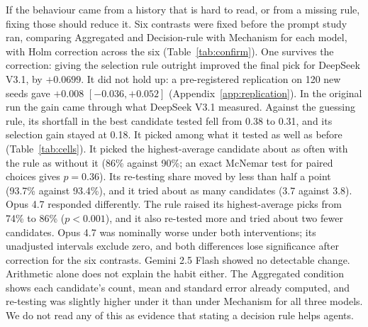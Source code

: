 If the behaviour came from a history that is hard to read, or from a missing rule, fixing those should reduce
it. Six contrasts were fixed before the prompt study ran, comparing Aggregated and Decision-rule with Mechanism for
each model, with Holm correction across the six (Table~\ref{tab:confirm}). One survives the correction: giving the selection rule outright improved the final pick for DeepSeek V3.1,
by $+0.0699$. It did not hold up: a pre-registered replication on 120 new seeds gave $+0.008$
$[-0.036, +0.052]$ (Appendix~\ref{app:replication}). In the original run the gain came through what DeepSeek V3.1 measured. Against the guessing rule, its
shortfall in the best candidate tested fell from 0.38 to 0.31, and its selection gain stayed at 0.18. It picked among what it tested as well as before (Table~\ref{tab:cells}). It
picked the highest-average candidate about as often with the rule as without it (86\% against 90\%; an exact
McNemar test for paired choices gives $p = 0.36$). Its re-testing share moved by less than half a point (93.7\% against 93.4\%), and it tried
about as many candidates (3.7 against 3.8). Opus 4.7 responded differently. The rule raised its
highest-average picks from 74\% to 86\% ($p < 0.001$), and it also re-tested more and tried about two fewer
candidates. Opus 4.7 was nominally worse under both interventions; its unadjusted intervals exclude zero, and both differences lose significance after correction for the six contrasts. Gemini 2.5 Flash showed no detectable change.
Arithmetic alone does not explain the habit either. The Aggregated condition shows each candidate's count, mean and
standard error already computed, and re-testing was slightly higher under it than under Mechanism for all three
models. We do not read any of this as evidence that stating a decision rule helps agents.

